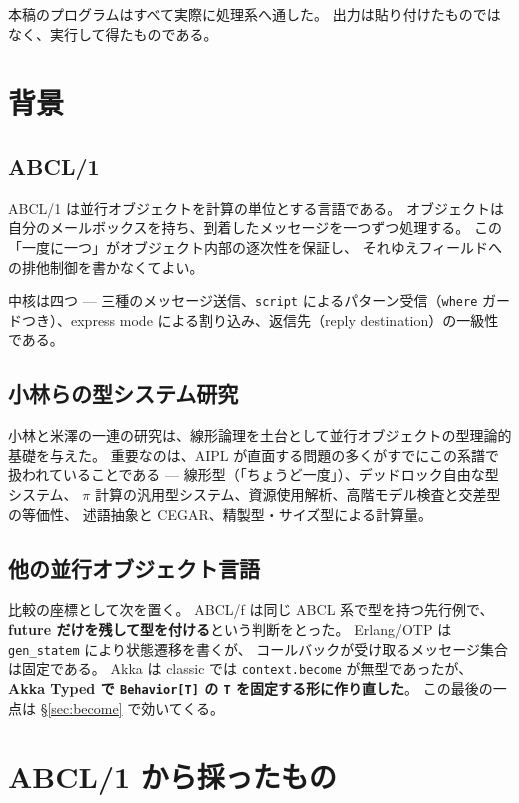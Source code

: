 \documentclass[11pt,a4paper]{ltjsarticle}
\theoremstyle{definition}
\theoremstyle{remark}
\begin{document}
本稿のプログラムはすべて実際に処理系へ通した。
出力は貼り付けたものではなく、実行して得たものである。

\section{背景}
\label{sec:bg}

\subsection{ABCL/1}

ABCL/1 は並行オブジェクトを計算の単位とする言語である。
オブジェクトは自分のメールボックスを持ち、到着したメッセージを一つずつ処理する。
この「一度に一つ」がオブジェクト内部の逐次性を保証し、
それゆえフィールドへの排他制御を書かなくてよい。

中核は四つ --- 三種のメッセージ送信、\texttt{script} によるパターン受信（\texttt{where}
ガードつき）、express mode による割り込み、返信先（reply destination）の一級性である。

\subsection{小林らの型システム研究}

小林と米澤の一連の研究は、線形論理を土台として並行オブジェクトの型理論的基礎を与えた。
重要なのは、AIPL が直面する問題の多くがすでにこの系譜で扱われていることである
--- 線形型（「ちょうど一度」）、デッドロック自由な型システム、
$\pi$ 計算の汎用型システム、資源使用解析、高階モデル検査と交差型の等価性、
述語抽象と CEGAR、精製型・サイズ型による計算量。

\subsection{他の並行オブジェクト言語}

比較の座標として次を置く。
ABCL/f は同じ ABCL 系で型を持つ先行例で、
\textbf{future だけを残して型を付ける}という判断をとった。
Erlang/OTP は \texttt{gen\_statem} により状態遷移を書くが、
コールバックが受け取るメッセージ集合は固定である。
Akka は classic では \texttt{context.become} が無型であったが、
\textbf{Akka Typed で \texttt{Behavior[T]} の \texttt{T} を固定する形に作り直した}。
この最後の一点は \S\ref{sec:become} で効いてくる。

\section{ABCL/1 から採ったもの}
\label{sec:abcl-take}
\end{document}
